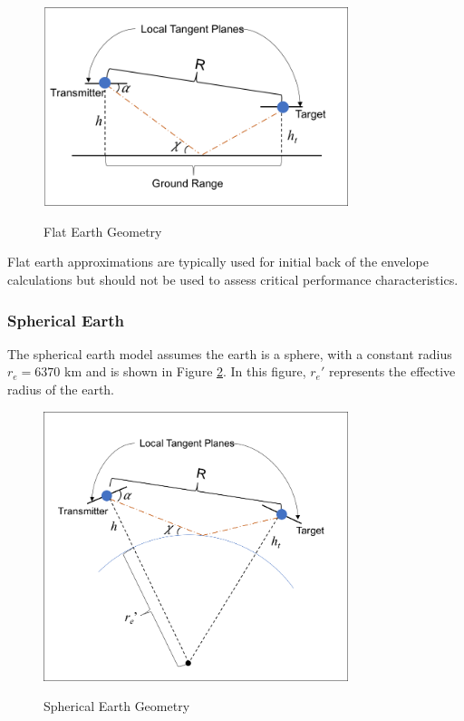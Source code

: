 \begin{figure}[H]
  \begin{center}
\includegraphics[width=3.5in]{../media/multistatic/flat_earth_geometry.png}
  \end{center}
  \renewcommand{\baselinestretch}{1} \small\normalsize
  \begin{quote}
    \caption[Flat Earth Geometry]{Flat Earth Geometry\label{env_fig:1}}
  \end{quote}
\end{figure}
\renewcommand{\baselinestretch}{2} \small\normalsize

Flat earth approximations are typically used for initial back of the envelope calculations but should not be used to assess critical performance characteristics. 

\subsubsection{Spherical Earth}
The spherical earth model assumes the earth is a sphere, with a constant radius $r_e = 6370$ km and is shown in Figure \ref{env_fig:2}. In this figure, $r_e'$ represents the effective radius of the earth.

\begin{figure}[H]
  \begin{center}
\includegraphics[width=3.5in]{../media/multistatic/spherical_earth_geometry.png}
  \end{center}
  \renewcommand{\baselinestretch}{1} \small\normalsize
  \begin{quote}
    \caption[Spherical Earth Geometry]{Spherical Earth Geometry\label{env_fig:2}}
  \end{quote}
\end{figure}
\renewcommand{\baselinestretch}{2} \small\normalsize

